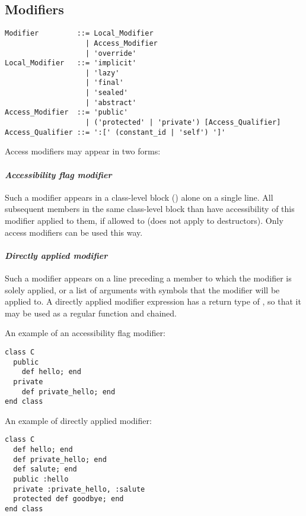 \subsection{Modifiers}
\label{sec:modifiers}

\syntax\begin{lstlisting}
Modifier         ::= Local_Modifier
                   | Access_Modifier
                   | 'override'
Local_Modifier   ::= 'implicit'
                   | 'lazy'
                   | 'final'
                   | 'sealed'
                   | 'abstract'
Access_Modifier  ::= 'public'
                   | ('protected' | 'private') [Access_Qualifier]
Access_Qualifier ::= ':[' (constant_id | 'self') ']'
\end{lstlisting}

Access modifiers may appear in two forms:

\paragraph{\em Accessibility flag modifier}
Such a modifier appears in a class-level block () alone on a single line. All subsequent members in the same class-level block than have accessibility of this modifier applied to them, if allowed to (does not apply to destructors). Only access modifiers can be used this way. 

\paragraph{\em Directly applied modifier}
Such a modifier appears on a line preceding a member to which the modifier is solely applied, or a list of arguments with symbols that the modifier will be applied to. A directly applied modifier expression has a return type of , so that it may be used as a regular function and chained. 

\example An example of an accessibility flag modifier:
\begin{lstlisting}
class C
  public
    def hello; end
  private
    def private_hello; end
end class
\end{lstlisting}

\example An example of directly applied modifier:
\begin{lstlisting}
class C
  def hello; end
  def private_hello; end
  def salute; end
  public :hello
  private :private_hello, :salute
  protected def goodbye; end
end class
\end{lstlisting}

